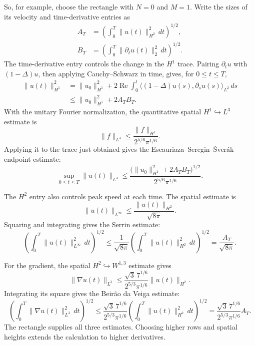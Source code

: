 So, for example, choose the rectangle with \(N=0\) and \(M=1\).
Write the sizes of its velocity and time-derivative entries as
\[
 \begin{aligned}
 A_T&=\left(\int_0^T\|u(t)\|_{H^2}^2\,dt\right)^{1/2},\\
 B_T&=\left(\int_0^T\|\partial_tu(t)\|_2^2\,dt\right)^{1/2}.
 \end{aligned}
\]
The time-derivative entry controls the change in the \(H^1\) trace.
Pairing \(\partial_tu\) with \((1-\Delta)u\), then applying
Cauchy--Schwarz in time, gives, for \(0\le t\le T\),
\[
 \begin{aligned}
 \|u(t)\|_{H^1}^2
 &=\|u_0\|_{H^1}^2
   +2\operatorname{Re}\int_0^t
       \langle(1-\Delta)u(s),\partial_su(s)\rangle_{L^2}\,ds\\
 &\le\|u_0\|_{H^1}^2+2A_TB_T.
 \end{aligned}
\]
With the unitary Fourier normalization, the quantitative spatial
\(H^1\hookrightarrow L^3\) estimate is
\[
 \|f\|_{L^3}\le\frac{\|f\|_{H^1}}{2^{5/6}\pi^{1/6}}.
\]
Applying it to the trace just obtained gives the
Escauriaza--Seregin--\v{S}ver\'ak endpoint estimate:
\[
 \sup_{0\le t\le T}\|u(t)\|_{L^3}
 \le \frac{\bigl(\|u_0\|_{H^1}^2+2A_TB_T\bigr)^{1/2}}
              {2^{5/6}\pi^{1/6}}.
\]

The \(H^2\) entry also controls peak speed at each time. The spatial
estimate is
\[
 \|u(t)\|_{L^\infty}\le\frac{\|u(t)\|_{H^2}}{\sqrt{8\pi}}.
\]
Squaring and integrating gives the Serrin estimate:
\[
 \left(\int_0^T\|u(t)\|_{L^\infty}^2\,dt\right)^{1/2}
 \le\frac1{\sqrt{8\pi}}
       \left(\int_0^T\|u(t)\|_{H^2}^2\,dt\right)^{1/2}
 =\frac{A_T}{\sqrt{8\pi}}.
\]

For the gradient, the spatial \(H^2\hookrightarrow W^{1,3}\) estimate gives
\[
 \|\nabla u(t)\|_{L^3}
 \le\frac{\sqrt3\,7^{1/6}}{2^{5/3}\pi^{1/6}}\|u(t)\|_{H^2}.
\]
Integrating its square gives the Beir\~ao da Veiga estimate:
\[
 \left(\int_0^T\|\nabla u(t)\|_{L^3}^2\,dt\right)^{1/2}
 \le\frac{\sqrt3\,7^{1/6}}{2^{5/3}\pi^{1/6}}
       \left(\int_0^T\|u(t)\|_{H^2}^2\,dt\right)^{1/2}
 =\frac{\sqrt3\,7^{1/6}}{2^{5/3}\pi^{1/6}}A_T.
\]
\label{guide:how-proof-ends}
The rectangle supplies all three estimates. Choosing higher rows and
spatial heights extends the calculation to higher derivatives.

\endgroup
